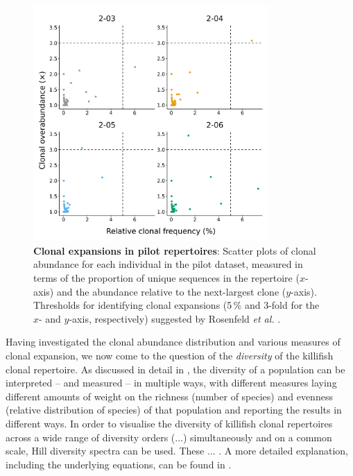 \begin{figure}
\centering
\includegraphics[width=0.8\textwidth]{_Figures/png/pilot-clones-expansions}
\caption[Clonal expansions in \Nfu pilot repertoires]{\textbf{Clonal expansions in \Nfu pilot repertoires}: Scatter plots of clonal abundance for each individual in the pilot \igseq dataset, measured in terms of the proportion of unique sequences in the repertoire ($x$-axis) and the abundance relative to the next-largest clone ($y$-axis). Thresholds for identifying clonal expansions (5\,\% and 3-fold for the $x$- and $y$-axis, respectively) suggested by Rosenfeld \textit{et al.} \parencite{rosenfeld2018clonesize}.}
\label{fig:igseq-pilot-clones-expansions}
\end{figure}

Having investigated the clonal abundance distribution and various measures of clonal expansion, we now come to the question of the \textit{diversity} of the killifish clonal repertoire. As discussed in detail in , the diversity of a population can be interpreted -- and measured -- in multiple ways, with different measures laying different amounts of weight on the richness (number of species) and evenness (relative distribution of species) of that population and reporting the results in different ways. In order to visualise the diversity of killifish clonal repertoires across a wide range of diversity orders (...) %
simultaneously and on a common scale, Hill diversity spectra %
can be used. These ... . %
A more detailed explanation, including the underlying equations, can be found in .

